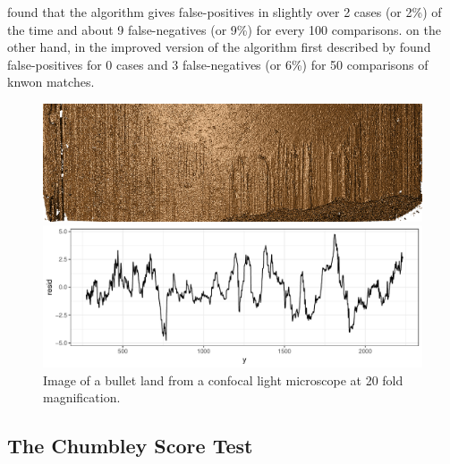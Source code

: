 \documentclass[12pt]{article}
\begin{document}
\citep{chumbley} found that the algorithm gives false-positives in
slightly over 2 cases (or 2\%) of the time and about 9 false-negatives
(or 9\%) for every 100 comparisons. \citep{hadler} on the other hand, in
the improved version of the algorithm first described by
\citep{chumbley} found false-positives for 0 cases and 3 false-negatives
(or 6\%) for 50 comparisons of knwon matches.

\begin{figure}
\centering
\includegraphics[width=\textwidth]{images/B6-B2-L6.png}

\begin{center}\includegraphics[width=\textwidth]{figures/unnamed-chunk-1-1} \end{center}

\caption{\label{fig:rgl} Image of a bullet land from a confocal light microscope at 20 fold magnification.}

\end{figure}

\subsection{The Chumbley Score Test}\label{the-chumbley-score-test}

\end{document}
